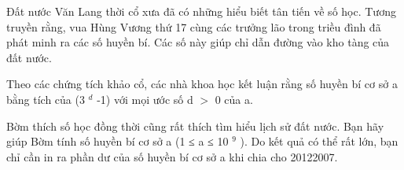 Đất nước Văn Lang thời cổ xưa đã có những hiểu biết tân tiến về số học. Tương truyền rằng, vua Hùng Vương thứ 17 cùng các trưởng lão   trong triều đình đã phát minh ra các số huyền bí. Các số này giúp chỉ dẫn đường vào kho tàng của đất nước.  

   Theo các chứng tích khảo cổ, các nhà khoa học kết luận rằng số huyền bí cơ sở a bằng tích của (3   $^    d   $   -1) với mọi ước số d $>$ 0   của a.  

   Bờm thích số học đồng thời cũng rất thích tìm hiểu lịch sử đất nước. Bạn hãy giúp Bờm tính số huyền bí cơ sở a (1 ≤ a ≤ 10   $^    9   $   ).   Do kết quả có thể rất lớn, bạn chỉ cần in ra phần dư của số huyền bí cơ sở a khi chia cho 20122007.  

\